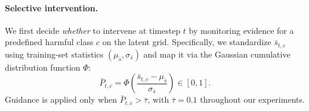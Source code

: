 \paragraph{Selective intervention.}
We first decide \emph{whether} to intervene at timestep $t$ by monitoring evidence for a predefined harmful class $c$ on the latent grid.
Specifically, we standardize $\bar{s}_{t,c}$ using training-set statistics $(\mu_{\bar s},\sigma_{\bar s})$ and map it via the Gaussian cumulative distribution function $\Phi$:
\begin{equation}
\label{eq:gradcam_ps}
\bar{P}_{t,c} = \Phi \!\left(
    \frac{\bar{s}_{t,c} - \mu_{\bar{s}}}{\sigma_{\bar{s}}}
\right) \in [0,1].
\end{equation}
Guidance is applied only when $\bar{P}_{t,c} > \bar{\tau}$, with $\bar{\tau}=0.1$ throughout our experiments.




